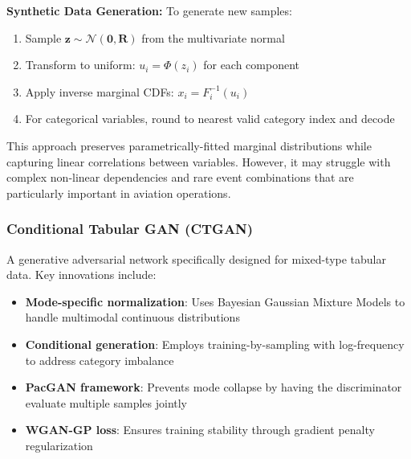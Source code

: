 \documentclass[conference]{IEEEtran}
\begin{document}
\textbf{Synthetic Data Generation:} To generate new samples:
\begin{enumerate}
    \item Sample $\mathbf{z} \sim \mathcal{N}(\mathbf{0}, \mathbf{R})$ from the multivariate normal
    \item Transform to uniform: $u_i = \Phi(z_i)$ for each component
    \item Apply inverse marginal CDFs: $x_i = F_i^{-1}(u_i)$
    \item For categorical variables, round to nearest valid category index and decode
\end{enumerate}

This approach preserves parametrically-fitted marginal distributions while capturing linear correlations between variables. However, it may struggle with complex non-linear dependencies and rare event combinations that are particularly important in aviation operations.





\subsubsection{Conditional Tabular GAN (CTGAN)} \cite{xu2019modeling}
A generative adversarial network specifically designed for mixed-type tabular data. Key innovations include:
\begin{itemize}
    \item \textbf{Mode-specific normalization}: Uses Bayesian Gaussian Mixture Models to handle multimodal continuous distributions
    \item \textbf{Conditional generation}: Employs training-by-sampling with log-frequency to address category imbalance
    \item \textbf{PacGAN framework}: Prevents mode collapse by having the discriminator evaluate multiple samples jointly
    \item \textbf{WGAN-GP loss}: Ensures training stability through gradient penalty regularization
\end{itemize}
\end{document}
